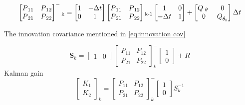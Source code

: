 \documentclass[a4paper,11pt]{kth-mag}
\begin{document}
\begin{equation}
\begin{bmatrix}
P\textsubscript{11} & P\textsubscript{12} \\
P\textsubscript{21} & P\textsubscript{22}
\end{bmatrix}^-\textsubscript{k} =
\begin{bmatrix}
1  & -\Delta t \\
0   & 1
\end{bmatrix}
\begin{bmatrix}
P\textsubscript{11} & P\textsubscript{12} \\
P\textsubscript{21} & P\textsubscript{22}
\end{bmatrix}\textsubscript{k-1}
\begin{bmatrix}
1 & 0 \\
-\Delta t & 1
\end{bmatrix}
+
\begin{bmatrix}
Q\textsubscript{ $\theta$ } & 0 \\
0 & Q\textsubscript{$\dot{\theta}_b$}
\end{bmatrix}
\Delta t
\end{equation}

The innovation covariance mentioned in \ref{eq:innovation cov}

\begin{equation} 
\textbf{S}_k=
\begin{bmatrix}
1 & 0
\end{bmatrix}
\begin{bmatrix}
P_{11} & P_{12} \\
P_{21} & P_{22} 
\end{bmatrix}^- _k
\begin{bmatrix}
1 \\ 0
\end{bmatrix}
+
R
\end{equation}
Kalman gain
\begin{equation}
\begin{bmatrix}
K_1 \\ K_2
\end{bmatrix}_k
=
\begin{bmatrix}
P_{11} & P_{12} \\
P_{21} & P_{22}
\end{bmatrix}^-_k
\begin{bmatrix}
1 \\ 0
\end{bmatrix}
S^{-1}_k
\end{equation}
\end{document}
